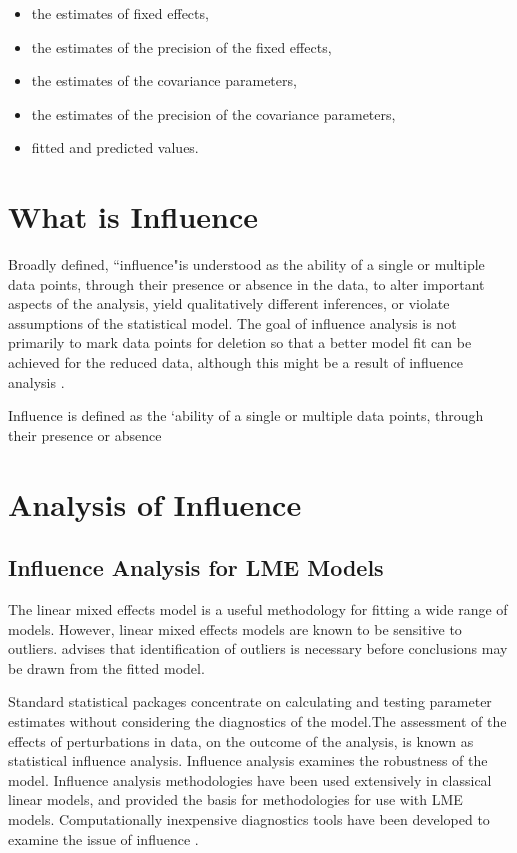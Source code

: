 \documentclass[12pt, a4paper]{article}
\begin{document}
\begin{itemize}
	\item the estimates of fixed effects,
	\item the estimates of the precision of the fixed effects,
	\item the estimates of the covariance parameters,
	\item the estimates of the precision of the covariance parameters,
	\item fitted and predicted values.
\end{itemize}



\section{What is Influence} %

Broadly defined, ``influence"is understood as the ability of a single or multiple data points, through their presence
or absence in the data, to alter important aspects of the analysis, yield qualitatively different inferences, or
violate assumptions of the statistical model. The goal of influence analysis is not primarily to mark data
points for deletion so that a better model fit can be achieved for the reduced data, although this might be a
result of influence analysis \citep{schabenberger}.

Influence is defined as the `ability of a single or multiple data points, through their presence or absence
\section{Analysis of  Influence}

\subsection{Influence Analysis for LME Models} %
The linear mixed effects model is a useful methodology for fitting a wide range of models. However, linear mixed effects models are known to be sensitive to outliers. \citet{CPJ} advises that identification of outliers is necessary before conclusions may be drawn from the fitted model.

Standard statistical packages concentrate on calculating and testing parameter estimates without considering the diagnostics of the model.The assessment of the effects of perturbations in data, on the outcome of the analysis, is known as statistical influence analysis. Influence analysis examines the robustness of the model. Influence analysis methodologies have been used extensively in classical linear models, and provided the basis for methodologies for use with LME models.
Computationally inexpensive diagnostics tools have been developed to examine the issue of influence \citep{Zewotir}.
\end{document}
